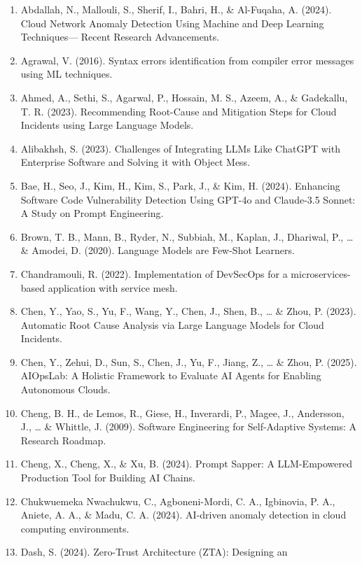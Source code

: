 \documentclass[
  a4paper,
  12pt,
  oneside,
  open=any,
  BCOR=12mm,
  DIV=14,
  parskip=half*,
  headsepline,
  footsepline,
  pointlessnumbers,
  liststotoc,
  numbers=noenddot,
  listof=totoc]{scrartcl}
\begin{document}
\begin{enumerate}
\def\labelenumi{\arabic{enumi}.}
\item
  Abdallah, N., Mallouli, S., Sherif, I., Bahri, H., \& Al-Fuqaha, A.
  (2024). Cloud Network Anomaly Detection Using Machine and Deep
  Learning Techniques--- Recent Research Advancements.
\item
  Agrawal, V. (2016). Syntax errors identification from compiler error
  messages using ML techniques.
\item
  Ahmed, A., Sethi, S., Agarwal, P., Hossain, M. S., Azeem, A., \&
  Gadekallu, T. R. (2023). Recommending Root-Cause and Mitigation Steps
  for Cloud Incidents using Large Language Models.
\item
  Alibakhsh, S. (2023). Challenges of Integrating LLMs Like ChatGPT with
  Enterprise Software and Solving it with Object Mess.
\item
  Bae, H., Seo, J., Kim, H., Kim, S., Park, J., \& Kim, H. (2024).
  Enhancing Software Code Vulnerability Detection Using GPT-4o and
  Claude-3.5 Sonnet: A Study on Prompt Engineering.
\item
  Brown, T. B., Mann, B., Ryder, N., Subbiah, M., Kaplan, J., Dhariwal,
  P., \ldots{} \& Amodei, D. (2020). Language Models are Few-Shot
  Learners.
\item
  Chandramouli, R. (2022). Implementation of DevSecOps for a
  microservices-based application with service mesh.
\item
  Chen, Y., Yao, S., Yu, F., Wang, Y., Chen, J., Shen, B., \ldots{} \&
  Zhou, P. (2023). Automatic Root Cause Analysis via Large Language
  Models for Cloud Incidents.
\item
  Chen, Y., Zehui, D., Sun, S., Chen, J., Yu, F., Jiang, Z., \ldots{} \&
  Zhou, P. (2025). AIOpsLab: A Holistic Framework to Evaluate AI Agents
  for Enabling Autonomous Clouds.
\item
  Cheng, B. H., de Lemos, R., Giese, H., Inverardi, P., Magee, J.,
  Andersson, J., \ldots{} \& Whittle, J. (2009). Software Engineering
  for Self-Adaptive Systems: A Research Roadmap.
\item
  Cheng, X., Cheng, X., \& Xu, B. (2024). Prompt Sapper: A LLM-Empowered
  Production Tool for Building AI Chains.
\item
  Chukwuemeka Nwachukwu, C., Agboneni-Mordi, C. A., Igbinovia, P. A.,
  Aniete, A. A., \& Madu, C. A. (2024). AI-driven anomaly detection in
  cloud computing environments.
\item
  Dash, S. (2024). Zero-Trust Architecture (ZTA): Designing an

\end{enumerate}
\end{document}
